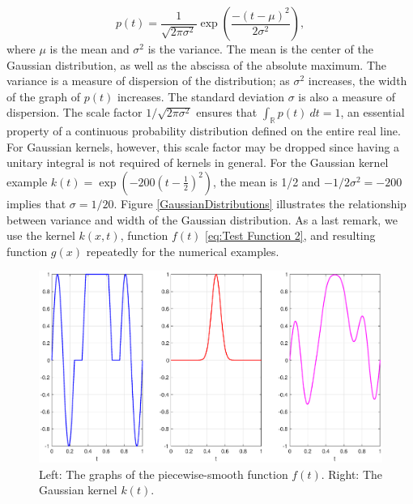 \documentclass[12pt,notitlepage]{report}
\newcommand{\noiseSD}{\sigma}	%
\begin{document}
\[p(t) = \frac{1}{\sqrt{2\pi\noiseSD^2}}\exp\left(\frac{-(t-\mu)^2}{2\noiseSD^2}\right),\]
where $\mu$ is the mean and $\noiseSD^2$ is the variance. The mean is the center of the Gaussian distribution, as well as the abscissa of the absolute maximum. The variance is a measure of dispersion of the distribution; as $\noiseSD^2$ increases, the width of the graph of $p(t)$ increases. The standard deviation $\noiseSD$ is also a measure of dispersion. The scale factor $1/\sqrt{2\pi\noiseSD^2}$ ensures that $\int_{\mathbb{R}} p(t) \: dt = 1$, an essential property of a continuous probability distribution defined on the entire real line. For Gaussian kernels, however, this scale factor may be dropped since having a unitary integral is not required of kernels in general.  For the Gaussian kernel example $k(t) = \exp(-200(t-\frac{1}{2})^2)$, the mean is 1/2 and $-1/2\noiseSD^2 = -200$ implies that $\noiseSD = 1/20$. Figure \ref{GaussianDistributions} illustrates the relationship between variance and width of the Gaussian distribution. As a last remark, we use the kernel $k(x,t)$, function $f(t)$ \eqref{eq:Test Function 2}, and resulting function $g(x)$ repeatedly for the numerical examples.

\begin{figure}
	\centerline{\includegraphics[scale=0.4]{Figures/FunctionKernelPlot.eps}}
\caption{Left: The graphs of the piecewise-smooth function $f(t)$. Right: The Gaussian kernel $k(t)$.}
\label{FunctionKernelPlot}
\end{figure}
\end{document}
